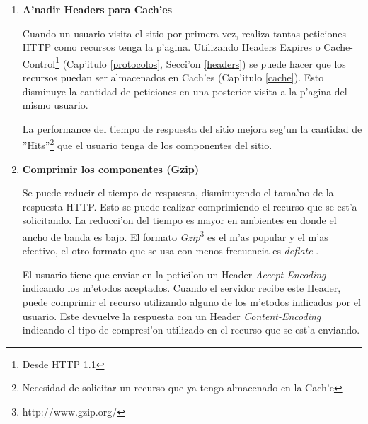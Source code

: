 \begin{enumerate}
La proximidad del cliente al servidor web tiene un impacto en el tiempo de respuesta de las peticiones. No es lo mismo solicitar un recurso localizado China estando en Argentina que uno ubicado dentro del mismo pa'is. Por ende, si los contenidos est'an cerca\footnote{En t'erminos de distancia f'isica.} el tiempo de respuesta es menor. Debido a que solo el 10-20\% del tiempo de respuesta se dedica al HTML (visto al inicio de este cap'itulo), si el resto de los recursos del sitio se encuentran cerca del cliente, se mejorar'ian los tiempos de respuesta. Para esto es necesario dispersar estos recursos geogr'aficamente.

Un CDN\footnote{Content Delivery Networks} es una red de distribuci'on de contenidos. Son servidores dispersados geogr'aficamente que ofrecen r'eplicas de los recursos de un sitio particular para brindarlos al cliente desde el m'as cercano a su locaci'on.

Utilizar el servicio que brinda un CDN mejora los tiempos de respuesta de los usuarios.
\item \textbf{A'nadir Headers para Cach'es}

Cuando un usuario visita el sitio por primera vez, realiza tantas peticiones HTTP como recursos tenga la p'agina. Utilizando Headers Expires o Cache-Control\footnote{Desde HTTP 1.1} (Cap'itulo \ref{protocolos}, Secci'on \ref{headers}) se puede hacer que los recursos puedan ser almacenados en Cach'es (Cap'itulo \ref{cache}). Esto disminuye la cantidad de peticiones en una posterior visita a la p'agina del mismo usuario.

La performance del tiempo de respuesta del sitio mejora seg'un la cantidad de ''Hits''\footnote{Necesidad de solicitar un recurso que ya tengo almacenado en la Cach'e} que el usuario tenga de los componentes del sitio.
\item \textbf{Comprimir los componentes (Gzip)}

Se puede reducir el tiempo de respuesta, disminuyendo el tama'no de la respuesta HTTP. Esto se puede realizar comprimiendo el recurso que se est'a solicitando. La reducci'on del tiempo es mayor en ambientes en donde el ancho de banda es bajo. El formato \textit{Gzip}\footnote{http://www.gzip.org/} \citep{rfcGzip} es el m'as popular y el m'as efectivo, el otro formato que se usa con menos frecuencia es \textit{deflate} \citep{rfcDeflate}.

El usuario tiene que enviar en la petici'on un Header \textit{Accept-Encoding} indicando los m'etodos aceptados. Cuando el servidor recibe este Header, puede comprimir el recurso utilizando alguno de los m'etodos indicados por el usuario. Este devuelve la respuesta con un Header \textit{Content-Encoding} indicando el tipo de compresi'on utilizado en el recurso que se est'a enviando.


\end{enumerate}
